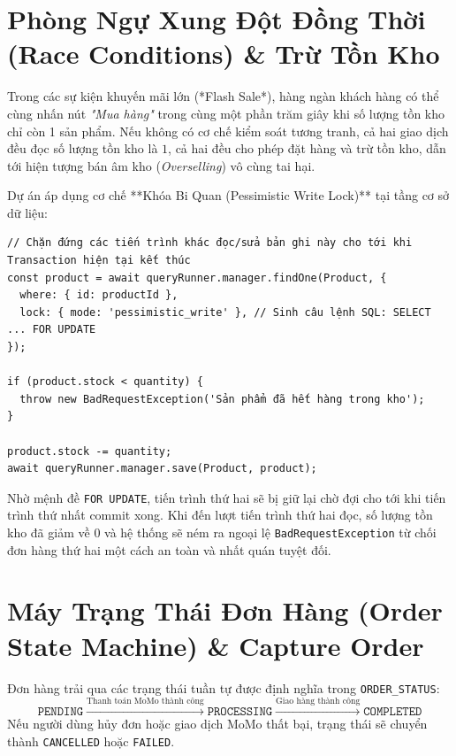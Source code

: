 \documentclass[12pt,a4paper,oneside]{book}
\begin{document}
\section{Phòng Ngự Xung Đột Đồng Thời (Race Conditions) \& Trừ Tồn Kho}
Trong các sự kiện khuyến mãi lớn (*Flash Sale*), hàng ngàn khách hàng có thể cùng nhấn nút \textit{"Mua hàng"} trong cùng một phần trăm giây khi số lượng tồn kho chỉ còn 1 sản phẩm. Nếu không có cơ chế kiểm soát tương tranh, cả hai giao dịch đều đọc số lượng tồn kho là $1$, cả hai đều cho phép đặt hàng và trừ tồn kho, dẫn tới hiện tượng bán âm kho (\textit{Overselling}) vô cùng tai hại.

Dự án áp dụng cơ chế **Khóa Bi Quan (Pessimistic Write Lock)** tại tầng cơ sở dữ liệu:
\begin{Verbatim}[fontsize=\small]
// Chặn đứng các tiến trình khác đọc/sửa bản ghi này cho tới khi Transaction hiện tại kết thúc
const product = await queryRunner.manager.findOne(Product, {
  where: { id: productId },
  lock: { mode: 'pessimistic_write' }, // Sinh câu lệnh SQL: SELECT ... FOR UPDATE
});

if (product.stock < quantity) {
  throw new BadRequestException('Sản phẩm đã hết hàng trong kho');
}

product.stock -= quantity;
await queryRunner.manager.save(Product, product);
\end{Verbatim}
Nhờ mệnh đề \texttt{FOR UPDATE}, tiến trình thứ hai sẽ bị giữ lại chờ đợi cho tới khi tiến trình thứ nhất commit xong. Khi đến lượt tiến trình thứ hai đọc, số lượng tồn kho đã giảm về $0$ và hệ thống sẽ ném ra ngoại lệ \texttt{BadRequestException} từ chối đơn hàng thứ hai một cách an toàn và nhất quán tuyệt đối.

\section{Máy Trạng Thái Đơn Hàng (Order State Machine) \& Capture Order}
Đơn hàng trải qua các trạng thái tuần tự được định nghĩa trong \texttt{ORDER\_STATUS}:
\begin{equation}
  \texttt{PENDING} \xrightarrow{\text{Thanh toán MoMo thành công}} \texttt{PROCESSING} \xrightarrow{\text{Giao hàng thành công}} \texttt{COMPLETED}
\end{equation}
Nếu người dùng hủy đơn hoặc giao dịch MoMo thất bại, trạng thái sẽ chuyển thành \texttt{CANCELLED} hoặc \texttt{FAILED}.
\end{document}
